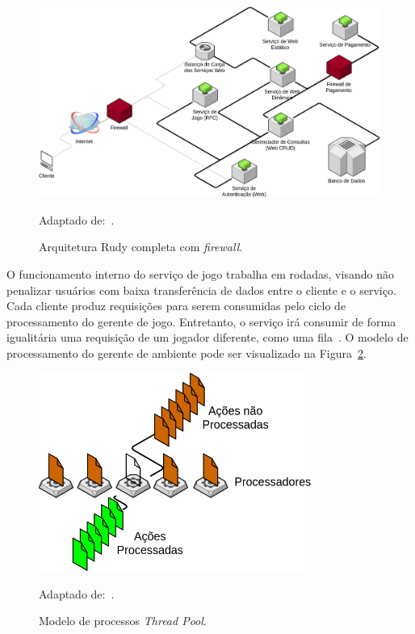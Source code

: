 \begin{figure}[htb!]
  \caption{Arquitetura Rudy completa com \textit{firewall}.}
  \label{full_rudy_fw}
  \includegraphics[width=\textwidth]{arquiteturas/full_rudy_fw.png}
  \centering

  Adaptado de:~\cite{matthiasrudy2011}.
\end{figure}




O funcionamento interno do serviço de jogo trabalha em rodadas, visando não penalizar usuários com baixa transferência de dados entre o cliente e o serviço.
%
Cada cliente produz requisições para serem consumidas pelo ciclo de processamento do gerente de jogo.
%
Entretanto, o serviço irá consumir de forma igualitária uma requisição de um jogador diferente, como uma fila~\cite{albion_online_unite, matthiasrudy2011}.
%
O modelo de processamento do gerente de ambiente pode ser visualizado na Figura~\ref{fig:thread_pool}.


\begin{figure}[htb!]
  \caption{Modelo de processos \textit{Thread Pool}.}
  \label{fig:thread_pool}
  \includegraphics[height=6.5cm]{arquiteturas/thread_pool.png}
  \centering

  Adaptado de:~\cite{matthiasrudy2011, Ringler2014Dec}.
\end{figure}

